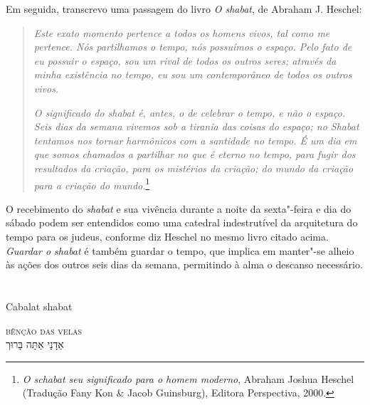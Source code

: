 Em seguida, transcrevo uma passagem do livro \emph{O shabat}, de Abraham
J. Heschel:

\begin{quote}
\emph{Este exato momento pertence a todos os homens vivos, tal como me
pertence. Nós partilhamos o tempo, nós possuímos o espaço. Pelo fato de
eu possuir o espaço, sou um rival de todos os outros seres; através da
minha existência no tempo, eu sou um contemporâneo de todos os outros
vivos.}

\emph{O significado do shabat é, antes, o de celebrar o tempo, e não o
espaço. Seis dias da semana vivemos sob a tirania das coisas do espaço;
no Shabat tentamos nos tornar harmônicos com a santidade no tempo. É um
dia em que somos chamados a partilhar no que é eterno no tempo, para
fugir dos resultados da criação, para os mistérios da criação; do mundo
da criação para a criação do mundo.}\footnote{\emph{O schabat seu significado para o homem moderno}, Abraham Joshua Heschel (Tradução Fany Kon \& Jacob Guinsburg), Editora Perspectiva, 2000.}
\end{quote}

O recebimento do \emph{shabat} e sua vivência durante a noite da sexta"-feira e
dia do sábado podem ser entendidos como uma catedral indestrutível da
arquitetura do tempo para os judeus, conforme diz Heschel no mesmo livro
citado acima. \emph{Guardar o shabat} é também guardar o tempo, que implica em
manter"-se alheio às ações dos outros seis dias da semana, permitindo à
alma o descanso necessário.


\chapter*{}
\begin{center}
\begin{vplace}[0.3]
\Large
Cabalat shabat
\end{vplace}
\end{center}
\thispagestyle{empty}


\movetoevenpage
\raggedleft

\vspace*{1cm}

\textsc{bênção das velas}\\[15pt]

אַדָנָי אַתָּה בָּרוּך

